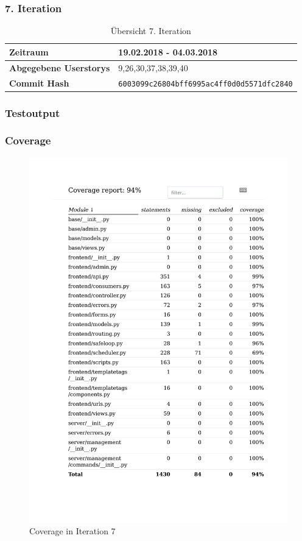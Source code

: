 \subsubsection{7. Iteration}
\begin{table}[H]
\begin{center}
	\begin{tabular}{| l | l |}
		\hline
		\textbf{Zeitraum} &  19.02.2018 - 04.03.2018\\\hline
		\textbf{Abgegebene Userstorys} & 9,26,30,37,38,39,40\\\hline
		\textbf{Commit Hash} & \texttt{6003099c26804bff6995ac4ff0d0d5571dfc2840} \\\hline
	\end{tabular}
	\caption{Übersicht 7. Iteration}
\end{center}
\end{table}
\subsubsection{Testoutput }

\subsubsection{Coverage}
\begin{figure}[H]
	\centering
\includegraphics[width=.9\textwidth]{test_output/07_iteration_coverage.pdf}
	\caption{Coverage in Iteration 7}
\end{figure}

